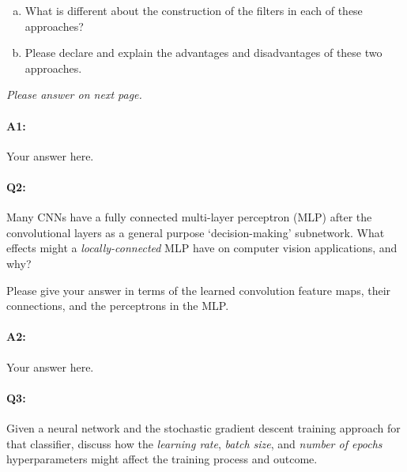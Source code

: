 \begin{enumerate} [(a)]
\item What is different about the construction of the filters in each of these approaches?
\item Please declare and explain the advantages and disadvantages of these two approaches.
\end{enumerate}
\emph{Please answer on next page.}

\pagebreak
\paragraph{A1:} Your answer here.






\pagebreak
\paragraph{Q2:} Many CNNs have a fully connected multi-layer perceptron (MLP) after the convolutional layers as a general purpose `decision-making' subnetwork. What effects might a \emph{locally-connected} MLP have on computer vision applications, and why?

Please give your answer in terms of the learned convolution feature maps, their connections, and the perceptrons in the MLP.

\paragraph{A2:} Your answer here.




\pagebreak
\paragraph{Q3:} Given a neural network and the stochastic gradient descent training approach for that classifier, discuss how the \emph{learning rate}, \emph{batch size}, and \emph{number of epochs} hyperparameters might affect the training process and outcome.


